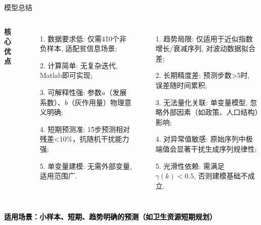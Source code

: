 \documentclass{beamer}
\begin{document}
 \begin{frame}{模型总结}
  \begin{columns}[T]
    \textbf{核心优点}
      \begin{itemize}
        \item[1.] 数据要求低: 仅需4\~ 10个非负样本, 适配贫信息场景; 
        \item[2.] 计算简单: 无复杂迭代, Matlab即可实现; 
        \item[3.] 可解释性强: 参数$a$（发展系数）、$b$（灰作用量）物理意义明确; 
        \item[4.] 短期预测准: 1\~5步预测相对残差<10\%，抗随机干扰能力强; 
        \item[5.] 单变量建模: 无需外部变量, 适用范围广. 
      \end{itemize}
      \begin{itemize}
        \item[1.] 趋势局限: 仅适用于近似指数增长/衰减序列, 对波动数据拟合差; 
        \item[2.] 长期精度差: 预测步数>5时, 误差随时间累积;
        \item[3.] 无法量化关联: 单变量模型, 忽略外部因素（如政策、人口结构）影响;
        \item[4.] 对异常值敏感: 原始序列中极端值会显著干扰生成序列规律性;
        \item[5.] 光滑性依赖: 需满足$\gamma(k)<0.5$, 否则建模基础不成立.
      \end{itemize}
  \end{columns}
  \vspace{0.5cm}
  \centering
  \textcolor{black}{\textbf{适用场景：小样本、短期、趋势明确的预测（如卫生资源短期规划）}}
\end{frame}
\end{document}
